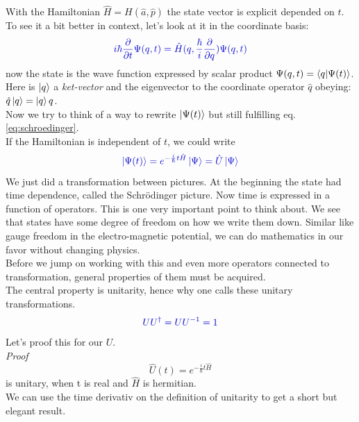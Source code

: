\documentclass[12pt, titlepage]{article}
\newcommand{\RM}[1]{\MakeUppercase{\romannumeral #1}}
\begin{document}
With the Hamiltonian $ \hat{H} = H(\hat{a}, \hat{p})  $ the state vector is explicit depended on $ t $. To see it a bit better in context, let's look at it in the coordinate basis:
\begin{equation}
\textcolor[RGB]{0,0,204}{
i \hbar \frac{\partial }{\partial t} \Psi (q,t) =
\hat{H} (q, \frac{\hbar}{i} \frac{\partial }{\partial q}) \Psi(q,t)}
\end{equation}
now the state is the wave function expressed by scalar product $ \Psi(q,t) = \braket{q |\Psi(t)} $. Here is $ \ket{q} $ a \textit{ket-vector} and the eigenvector to the coordinate operator $ \hat{q} $ obeying: $ \hat{q}\ket{q}=\ket{q}q $.
\\
Now we try to think of a way to rewrite $  \ket{\Psi(t)}$ but still fulfilling eq. \eqref{eq:schroedinger}.
\\
If the Hamiltonian is  independent of $ t $, we could write \\
\begin{equation}
\textcolor[RGB]{0,0,204}{
\ket{\Psi(t)} = e^{-\frac{i}{\hbar}t\hat{H}}\ket{\Psi}
=\hat{U}\ket{\Psi}
}
\end{equation}
We just did a transformation between pictures. At the beginning the state had time dependence, called the Schrödinger picture. Now time is expressed in a function of operators.
This is one very important point to think about. We see that states have some degree of freedom on how we write them down. Similar like gauge freedom in the electro-magnetic potential, we can do mathematics in our favor without changing physics.\\
Before we jump on working with this and even more operators connected to transformation, general properties of them must be acquired.
\\
The central property is unitarity, hence why one calls these unitary transformations. 
\begin{equation}\label{eq:unitary}
\textcolor[RGB]{0,0,204}{
UU^{\dagger}= UU^{-1}=1
}
\end{equation}
Let's proof this for our $ U $.\\
\emph{\textit{Proof \RM{1}}}
\begin{equation*}
\hat{U}(t)=e^{-\frac{i}{\hbar}t\hat{H}}
\end{equation*}
 is unitary, when t is real and $\hat{H}$ is hermitian.
 \\
 We can use the time derivativ on the definition of unitarity to get a short but elegant result.
\\
\end{document}
